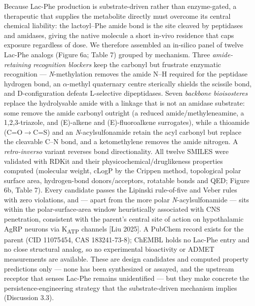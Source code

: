 \documentclass[11pt]{article}
\begin{document}
Because Lac-Phe production is substrate-driven rather than enzyme-gated, a therapeutic that
supplies the metabolite directly must overcome its central chemical liability: the
lactoyl--Phe amide bond is the site cleaved by peptidases and amidases, giving the native
molecule a short in-vivo residence that caps exposure regardless of dose. We therefore
assembled an in-silico panel of twelve Lac-Phe analogs (Figure 6a; Table 7) grouped by
mechanism. Three \textit{amide-retaining recognition blockers} keep the carbonyl but frustrate
enzymatic recognition --- \textit{N}-methylation removes the amide N--H required for the
peptidase hydrogen bond, an $\alpha$-methyl quaternary centre sterically shields the scissile
bond, and D-configuration defeats L-selective dipeptidases. Seven \textit{backbone
bioisosteres} replace the hydrolysable amide with a linkage that is not an amidase substrate:
some remove the amide carbonyl outright (a reduced amide/methyleneamine, a 1,2,3-triazole, and
(E)-alkene and (E)-fluoroalkene surrogates), while a thioamide (C=O$\rightarrow$C=S) and an
\textit{N}-acylsulfonamide retain the acyl carbonyl but replace the cleavable C--N bond, and a
ketomethylene removes the amide nitrogen. A \textit{retro-inverso} variant reverses bond
directionality. All twelve SMILES were validated with RDKit and their
physicochemical/druglikeness properties computed (molecular weight, cLogP by the Crippen
method, topological polar surface area, hydrogen-bond donors/acceptors, rotatable bonds and
QED; Figure 6b, Table 7). Every candidate passes the Lipinski rule-of-five and Veber rules
with zero violations, and --- apart from the more polar \textit{N}-acylsulfonamide --- sits
within the polar-surface-area window heuristically associated with CNS penetration, consistent
with the parent's central site of action on hypothalamic AgRP neurons via K\textsubscript{ATP}
channels [Liu 2025]. A PubChem record exists for the parent (CID 11075454, CAS 183241-73-8);
ChEMBL holds no Lac-Phe entry and no close structural analog, so no experimental bioactivity or
ADMET measurements are available. These are design candidates and computed property
predictions only --- none has been synthesized or assayed, and the upstream receptor that
senses Lac-Phe remains unidentified --- but they make concrete the persistence-engineering
strategy that the substrate-driven mechanism implies (Discussion 3.3).
\end{document}
